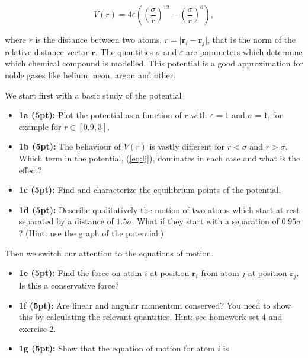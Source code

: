 \documentclass[%
oneside,                 %
final,                   %
10pt]{article}
\begin{document}
\begin{equation}
    V(r) = 4\varepsilon\left((\frac{\sigma}{r})^{12} - (\frac{\sigma}{r})^6\right), \label{eq:lj}
\end{equation}

where $r$ is the distance between two atoms,
$r=\vert\bm{r}_i-\bm{r}_j\vert$, that is the norm of the relative
distance vector $\bm{r}$. The quantities $\sigma$ and $\varepsilon$ are
parameters which determine which chemical compound is modelled. This
potential is a good approximation for noble gases like helium, neon, argon and other.

We start first with a basic study of the potential

\begin{itemize}
\item \textbf{1a (5pt):} Plot the potential as a function of $r$ with $\varepsilon=1$ and $\sigma=1$, for example for $r \in [0.9,3]$.

\item \textbf{1b (5pt):} The behaviour of $V(r)$ is vastly different for $r < \sigma$ and $r > \sigma$. Which term in the potential, (\ref{eq:lj}), dominates in each case and what is the effect?

\item \textbf{1c (5pt):} Find and characterize the equilibrium points of the potential.

\item \textbf{1d (5pt):} Describe qualitatively the motion of two atoms which start at rest separated by a distance of ${1.5}\sigma$. What if they start with a separation of ${0.95}\sigma$?  (Hint: use the graph of the potential.)
\end{itemize}

\noindent
Then we switch our attention to the equations of motion.

\begin{itemize}
\item \textbf{1e (5pt):} Find the force on atom $i$ at position $\bm{r}_i$ from atom $j$ at position $\bm{r}_j$. Is this a conservative force?

\item \textbf{1f (5pt):}  Are linear and angular momentum conserved? You need to show this by calculating the relevant quantities. Hint: see homework set 4 and exercise 2.

\item \textbf{1g (5pt):} Show that the equation of motion for atom $i$ is
\end{itemize}
\end{document}
